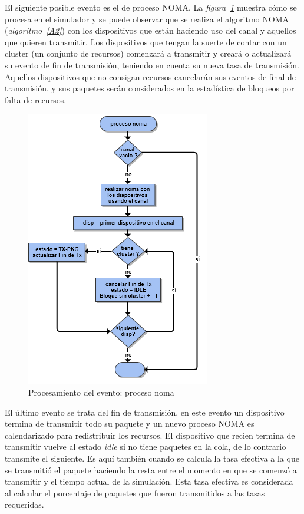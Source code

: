 El siguiente posible evento es el de proceso NOMA. La \textit{figura~\ref{fig:flownoma}} muestra cómo se procesa en el simulador y se puede observar que se realiza el algoritmo NOMA (\textit{algoritmo~\ref{A2}}) con los dispositivos que están haciendo uso del canal y aquellos que quieren transmitir. Los dispositivos que tengan la suerte de contar con un cluster (un conjunto de recursos) comenzará a transmitir y creará o actualizará su evento de fin de transmisión, teniendo en cuenta su nueva tasa de transmisión. Aquellos dispositivos que no consigan recursos cancelarán sus eventos de final de transmisión, y sus paquetes serán considerados en la estadística de bloqueos por falta de recursos. \newline

\begin{figure}[th]
    \centering
    \includegraphics[scale=1]{Figures/flownoma.png}
    \decoRule
    \caption[Procesamiento del evento: proceso noma]{Procesamiento del evento: proceso noma}
    \label{fig:flownoma}
\end{figure}

El último evento se trata del fin de transmisión, en este evento un dispositivo termina de transmitir todo su paquete y un nuevo proceso NOMA es calendarizado para redistribuir los recursos. El dispositivo que recien termina de transmitir vuelve al estado \textit{idle} si no tiene paquetes en la cola, de lo contrario transmite el siguiente. Es aquí también cuando se calcula la tasa efectiva a la que se transmitió el paquete haciendo la resta entre el momento en que se comenzó a transmitir y el tiempo actual de la simulación. Esta tasa efectiva es considerada al calcular el porcentaje de paquetes que fueron transmitidos a las tasas requeridas.\newline

